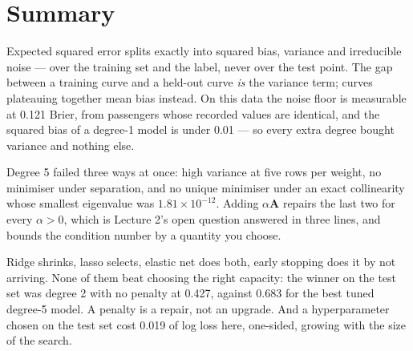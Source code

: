 \documentclass[11pt,a4paper]{article}
\begin{document}
\section*{Summary}

Expected squared error splits exactly into squared bias, variance and
irreducible noise --- over the training set and the label, never over the test
point. The gap between a training curve and a held-out curve \emph{is} the
variance term; curves plateauing together mean bias instead. On this data the
noise floor is measurable at 0.121 Brier, from passengers whose recorded values
are identical, and the squared bias of a degree-1 model is under 0.01 --- so
every extra degree bought variance and nothing else.

Degree 5 failed three ways at once: high variance at five rows per weight, no
minimiser under separation, and no unique minimiser under an exact collinearity
whose smallest eigenvalue was $1.81\times10^{-12}$. Adding $\alpha\mathbf{A}$
repairs the last two for every $\alpha > 0$, which is Lecture 2's open question
answered in three lines, and bounds the condition number by a quantity you
choose.

Ridge shrinks, lasso selects, elastic net does both, early stopping does it by
not arriving. None of them beat choosing the right capacity: the winner on the
test set was degree 2 with no penalty at 0.427, against 0.683 for the best
tuned degree-5 model. A penalty is a repair, not an upgrade. And a
hyperparameter chosen on the test set cost 0.019 of log loss here, one-sided,
growing with the size of the search.
\end{document}
